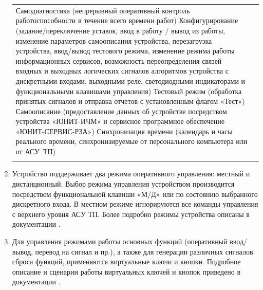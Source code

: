 \begin{enumerate}[label=\arabic{section}.\arabic{subsection}.\arabic*, labelsep=7pt, leftmargin=0pt, itemindent=60pt, align=left]
\begin{longtable}{|>{\centering\arraybackslash}m{3.2cm}|>{\raggedright\arraybackslash}m{13.7cm}|}
  Самодиагностика (непрерывный оперативный контроль работоспособности в течение всего времени работ)\newline
  Конфигурирование (задание/переключение уставок, ввод в работу / вывод из работы, изменение параметров самоописания устройства, перезагрузка устройства, ввод/вывод тестового режима, изменение режима работы информационных сервисов, возможность переопределения связей входных и выходных логических сигналов алгоритмов устройства с дискретными входами, выходными реле, светодиодными индикаторами и функциональными клавишами управления)\newline
  Тестовый режим (обработка принятых сигналов и отправка отчетов с установленным флагом «Тест»)\newline
  Самоописание (предоставление данных об устройстве посредством устройства «ЮНИТ-ИЧМ» и сервисное программное обеспечение «ЮНИТ-СЕРВИС-РЗА»)\newline
  Синхронизация времени (календарь и часы реального времени, синхронизируемые от персонального компьютера или от АСУ~ТП) \\ \hhline{|-|-|}
\end{longtable}
\endgroup

\item Устройство поддерживает два режима оперативного управления: местный и дистанционный.
Выбор режима управления устройством производится посредством функциональной клавиши «М/Д» или по состоянию выбранного дискретного входа.
В местном режиме игнорируются все команды управления с верхнего уровня АСУ ТП. Более подробно режимы устройства описаны в документации \ManualUnitGeneral.

\item Для управления режимами работы основных функций (оперативный ввод/вывод, перевод на сигнал и пр.), а также для генерации различных сигналов сброса функций, применяются виртуальные ключи и кнопки.
Подробное описание и сценарии работы виртуальных ключей и кнопок приведено в документации \ManualUnitGeneral.


\end{enumerate}
